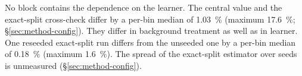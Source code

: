 
No block contains the dependence on the learner. The central value and the exact-split cross-check differ by a per-bin median of \SI{1.03}{\percent} (maximum \SI{17.6}{\percent}; \S\ref{sec:method-config}). They differ in background treatment as well as in learner. One reseeded exact-split run differs from the unseeded one by a per-bin median of \SI{0.18}{\percent} (maximum \SI{1.6}{\percent}). The spread of the exact-split estimator over seeds is unmeasured (\S\ref{sec:method-config}).

